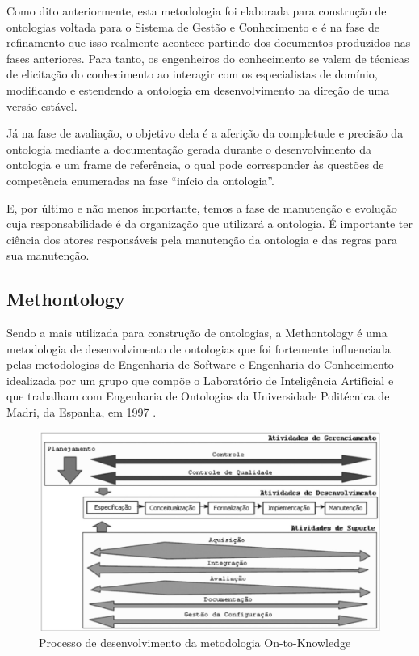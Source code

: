 Como dito anteriormente, esta metodologia foi elaborada para construção de ontologias voltada para o Sistema de Gestão e Conhecimento e é na fase de refinamento que isso realmente acontece partindo dos documentos produzidos nas fases anteriores. Para tanto, os engenheiros do conhecimento se valem de técnicas de elicitação do conhecimento ao interagir com os especialistas de domínio, modificando e estendendo a ontologia em desenvolvimento na direção de uma versão estável.

Já na fase de avaliação, o objetivo dela é a aferição da completude e precisão da ontologia mediante a documentação gerada durante o desenvolvimento da ontologia e um frame de referência, o qual pode corresponder às questões de competência enumeradas na fase “início da ontologia”. 

E, por último e não menos importante, temos a fase de manutenção e evolução cuja responsabilidade é da organização que utilizará a ontologia. É importante ter ciência dos atores responsáveis pela manutenção da ontologia e das regras para sua manutenção.

\subsection{Methontology}

Sendo a mais utilizada para construção de ontologias, a Methontology é uma metodologia de desenvolvimento de ontologias que foi fortemente influenciada pelas metodologias de Engenharia de Software e Engenharia do Conhecimento idealizada por um grupo que compõe o Laboratório de Inteligência Artificial e que trabalham com Engenharia de Ontologias da Universidade Politécnica de Madri, da Espanha,  em 1997 \cite{gomez}.

 \begin{figure}[ht]
	\centering
		\includegraphics[keepaspectratio=true,scale=0.5]{figuras/metodology.eps}
	\caption{Processo de desenvolvimento da metodologia On-to-Knowledge}
	\label{metodology}
\end{figure}

